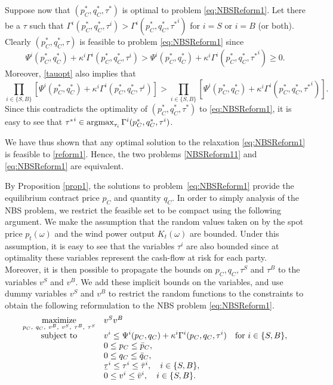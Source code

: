 Suppose now that $(p_C^*, q_C^*, \tau^*)$ is optimal to problem
\eqref{eq:NBSReform1}. Let there be a $\tau$ such that $\Gamma^i(p_C^*, q_C^*,
\tau^i) > \Gamma^i(p_C^*, q_C^*, {\tau^*}^i)$ for $i = S$ or $i = B$ (or both).
Clearly $(p_C^*, q_C^*, \tau)$ is feasible to problem \eqref{eq:NBSReform1}
since 
\begin{equation} \label{tauopt}
\Psi^i(p_C^*, q_C^*) + \kappa^i \Gamma^i (p_C^*, q_C^*, \tau^i) > \Psi^i(p_C^*,
q_C^*) +
\kappa^i \Gamma^i (p_C^*, q_C^*, {\tau^*}^i) \geq 0.
\end{equation}
Moreover, \eqref{tauopt} also implies that
\begin{equation*}
	\prod_{i \in \{S,B\}} \left[\Psi^i(p_C^*, q_C^*) + \kappa^i \Gamma^i (p_C^*,
	q_C^*,
	\tau^i)\right] > \prod_{i \in \{S,B\}} \left[\Psi^i(p_C^*, q_C^*) + \kappa^i
	\Gamma^i (p_C^*, q_C^*, {\tau^*}^i)\right].
\end{equation*}
Since this contradicts the optimality of $(p_C^*, q_C^*, \tau^*)$ to
\eqref{eq:NBSReform1}, it is easy to see that ${\tau^*}^i \in \mathop{\mbox{argmax}}_{\tau_i}
\Gamma^i(p_C^*, q_C^*, \tau^i)$. 

We have thus shown that any optimal solution to the relaxation
\eqref{eq:NBSReform1} is feasible to \eqref{reform1}. Hence, the two problems
\eqref{NBSReform11} and \eqref{eq:NBSReform1} are equivalent.
\endproof

By Proposition \ref{prop1}, the solutions to problem~\eqref{eq:NBSReform1}
provide the equilibrium contract price $p_C$ and quantity $q_C$.
In order to simply analysis of the NBS problem, we restrict the feasible set to
be compact using the following argument. We make the assumption that the random
values taken on by the spot price $p_t(\omega)$ and the wind power output
$K_t(\omega)$ are bounded. Under this assumption, it is easy to see that the
variables $\tau^i$ are also bounded since at optimality these variables
represent the cash-flow at risk for each party. Moreover, it is then possible to
propagate the bounds on $p_C, q_C, \tau^S$ and $\tau^B$ to the variables $v^S$
and $v^B$. We add these implicit bounds on the variables, and use dummy
variables $v^S$ and $v^B$ to restrict the random functions to the constraints to
obtain the following reformulation to the NBS problem \eqref{eq:NBSReform1}.
\begin{equation} \label{NBSReform_2}
\begin{array}{cl}
\maximize{p_C,\ q_C,\ v^B,\ v^S,\ \tau^B,\ \tau^S} &  v^S v^B  \\
\st & \displaystyle v^i  \leq  \Psi^i(p_C, q_C) + \kappa^i  \Gamma^i (p_C, q_C,
\tau^i) \quad \text{for} \ i \in \{S,B\},\\%
& 0 \leq p_C \leq \bar{p}_C, \\
& 0 \leq q_C \leq \bar{q}_C, \\
& \ubar{\tau}^i \leq \tau^i \leq \bar{\tau}^i, \quad i \in \{S,B\}, \\
& 0 \leq v^i \leq \bar{v}^i, \quad i \in \{S,B\}.
\end{array}
\end{equation}

